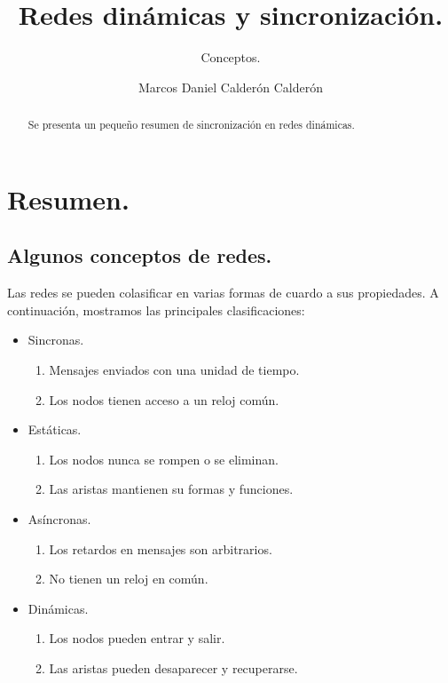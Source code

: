 \documentclass{llncs}
\theoremstyle{plane}
\begin{document}
\title{Redes dinámicas y sincronización.}



\subtitle{Conceptos.}


\author{Marcos Daniel Calderón Calderón}





\maketitle

\begin{abstract}
Se presenta un pequeño resumen de sincronización en redes dinámicas.
\end{abstract}
\section{Resumen.}

\subsection{Algunos conceptos de redes.}

Las redes se pueden colasificar en varias formas de cuardo a sus propiedades. A continuación, mostramos las principales clasificaciones:

\begin{itemize}
\item Sincronas.

\begin{enumerate}
\item  Mensajes enviados con una unidad de tiempo.
\item  Los nodos tienen acceso a un reloj común.
\end{enumerate}

\item Estáticas.
\begin{enumerate}
\item  Los nodos nunca se rompen o se eliminan.
\item  Las aristas mantienen su formas y funciones.
\end{enumerate}


\item Asíncronas.
\begin{enumerate}
\item Los retardos en mensajes son arbitrarios.
\item No tienen un reloj en común.
\end{enumerate}


\item Dinámicas.
\begin{enumerate}
\item Los nodos pueden entrar y salir.
\item Las aristas pueden desaparecer y recuperarse.
\end{enumerate}


\end{itemize}
\end{document}
